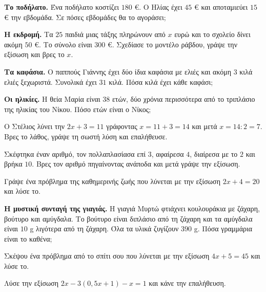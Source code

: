 \ex \textbf{Το ποδήλατο.} Ένα ποδήλατο κοστίζει $180$ €. Ο Ηλίας έχει $45$ € και αποταμιεύει $15$ € την εβδομάδα. Σε πόσες εβδομάδες θα το αγοράσει;

\ex \textbf{Η εκδρομή.} Τα $25$ παιδιά μιας τάξης πληρώνουν από $x$ ευρώ και το σχολείο δίνει ακόμη $50$ €. Το σύνολο είναι $300$ €. Σχεδίασε το μοντέλο ράβδου, γράψε την εξίσωση και βρες το $x$.

\ex \textbf{Τα καφάσια.} Ο παππούς Γιάννης έχει δύο ίδια καφάσια με ελιές και ακόμη $3$ κιλά ελιές ξεχωριστά. Συνολικά έχει $31$ κιλά. Πόσα κιλά έχει κάθε καφάσι;

\ex \textbf{Οι ηλικίες.} Η θεία Μαρία είναι $38$ ετών, δύο χρόνια περισσότερα από το τριπλάσιο της ηλικίας του Νίκου. Πόσο ετών είναι ο Νίκος;


\ex Ο Στέλιος λύνει την $2x+3=11$ γράφοντας $x=11+3=14$ και μετά $x=14:2=7$. Βρες το λάθος, γράψε τη σωστή λύση και επαλήθευσε.

\ex Σκέφτηκα έναν αριθμό, τον πολλαπλασίασα επί $3$, αφαίρεσα $4$, διαίρεσα με το $2$ και βρήκα $10$. Βρες τον αριθμό πηγαίνοντας ανάποδα και μετά γράψε την εξίσωση.

\ex Γράψε ένα πρόβλημα της καθημερινής ζωής που λύνεται με την εξίσωση $2x+4=20$ και λύσε το.

\ex \textbf{Η μυστική συνταγή της γιαγιάς.} Η γιαγιά Μυρτώ φτιάχνει κουλουράκια με ζάχαρη, βούτυρο και αμύγδαλα. Το βούτυρο είναι διπλάσιο από τη ζάχαρη και τα αμύγδαλα είναι $10$ g λιγότερα από τη ζάχαρη. Όλα τα υλικά ζυγίζουν $390$ g. Πόσα γραμμάρια είναι το καθένα;


\ex Σκέψου ένα πρόβλημα από το σπίτι σου που λύνεται με την εξίσωση $4x+5=45$ και λύσε το.

\ex Λύσε την εξίσωση $2x-3(0{,}5x+1)-x=1$ και κάνε την επαλήθευση.
